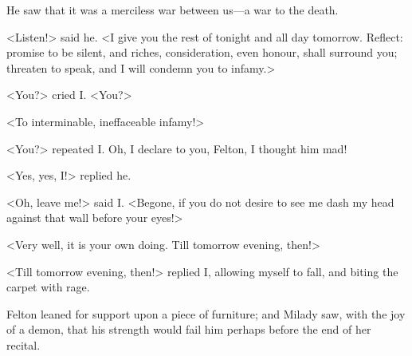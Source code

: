 {He saw that it was a merciless war between us---a war to the death. 

<Listen!> said he. <I give you the rest of tonight and all day tomorrow. Reflect: promise to be silent, and riches, consideration, even honour, shall surround you; threaten to speak, and I will condemn you to infamy.> 

<You?> cried I. <You?> 

<To interminable, ineffaceable infamy!>

<You?> repeated I. Oh, I declare to you, Felton, I thought him mad! 

<Yes, yes, I!> replied he. 

<Oh, leave me!> said I. <Begone, if you do not desire to see me dash my head against that wall before your eyes!> 

<Very well, it is your own doing. Till tomorrow evening, then!>

<Till tomorrow evening, then!> replied I, allowing myself to fall, and biting the carpet with rage.} 

Felton leaned for support upon a piece of furniture; and Milady saw, with the joy of a demon, that his strength would fail him perhaps before the end of her recital. 
